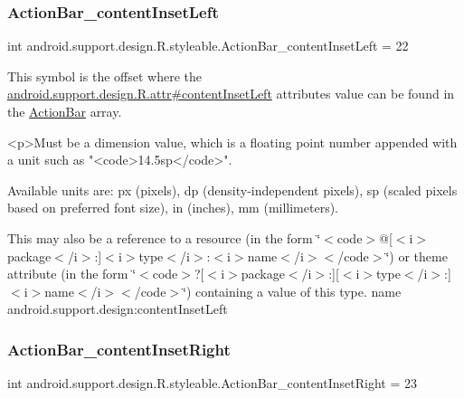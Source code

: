 \subsubsection{\texorpdfstring{Action\+Bar\+\_\+content\+Inset\+Left}{ActionBar\_contentInsetLeft}}
{\footnotesize\ttfamily int android.\+support.\+design.\+R.\+styleable.\+Action\+Bar\+\_\+content\+Inset\+Left = 22\hspace{0.3cm}{\ttfamily [static]}}

This symbol is the offset where the \hyperlink{classandroid_1_1support_1_1design_1_1R_1_1attr_a158a78f4136ee86acfbc3de6d947ee1c}{android.\+support.\+design.\+R.\+attr\#content\+Inset\+Left} attribute\textquotesingle{}s value can be found in the \hyperlink{classandroid_1_1support_1_1design_1_1R_1_1styleable_ab795220a96557d11f8c21359b95bed82}{Action\+Bar} array.

\begin{DoxyVerb}      <p>Must be a dimension value, which is a floating point number appended with a unit such as "<code>14.5sp</code>".
\end{DoxyVerb}
 Available units are\+: px (pixels), dp (density-\/independent pixels), sp (scaled pixels based on preferred font size), in (inches), mm (millimeters). 

This may also be a reference to a resource (in the form \char`\"{}$<$code$>$@\mbox{[}$<$i$>$package$<$/i$>$\+:\mbox{]}$<$i$>$type$<$/i$>$\+:$<$i$>$name$<$/i$>$$<$/code$>$\char`\"{}) or theme attribute (in the form \char`\"{}$<$code$>$?\mbox{[}$<$i$>$package$<$/i$>$\+:\mbox{]}\mbox{[}$<$i$>$type$<$/i$>$\+:\mbox{]}$<$i$>$name$<$/i$>$$<$/code$>$\char`\"{}) containing a value of this type.  name android.\+support.\+design\+:content\+Inset\+Left \mbox{\label{classandroid_1_1support_1_1design_1_1R_1_1styleable_ae5f3307b79082ad75d0a290ff147ad9b}} 
\subsubsection{\texorpdfstring{Action\+Bar\+\_\+content\+Inset\+Right}{ActionBar\_contentInsetRight}}
{\footnotesize\ttfamily int android.\+support.\+design.\+R.\+styleable.\+Action\+Bar\+\_\+content\+Inset\+Right = 23\hspace{0.3cm}{\ttfamily [static]}}

